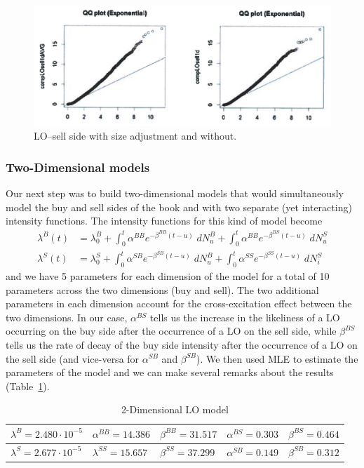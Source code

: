 	\begin{figure}[!ht]
   	\centering
   	\includegraphics[width=\textwidth]{chapters/chapter_trade_data_models/figures/losellsideadj.png} 
   	\caption{LO--sell side with size adjustment and without. \label{fig:losellsideadj}}
	\end{figure}


\subsubsection{Two-Dimensional models}

Our next step was to build two-dimensional models that would simultaneously model the buy and sell sides of the book and with two separate (yet interacting) intensity functions. The intensity functions for this kind of model become
	\[
	\begin{split}
	\lambda^B(t)&= \lambda_0^B + \int_0^t \alpha^{BB} e^{-\beta^{BB}(t-u)} \;dN_u^B + \int_0^t \alpha^{BB} e^{-\beta^{BS}(t-u)} \;dN_u^S \\
	\lambda^S(t)&= \lambda_0^S + \int_0^t \alpha^{SB} e^{-\beta^{SB}(t-u)} \; dN_u^B + \int_0^t \alpha^{SS} e^{-\beta^{SS}(t-u)} \;dN_i^S
	\end{split}
	\]
and we have 5 parameters for each dimension of the model for a total of 10 parameters across the two dimensions (buy and sell). The two additional parameters in each dimension account for the cross-excitation effect between the two dimensions. In our case, $\alpha^{BS}$ tells us the increase in the likeliness of a LO occurring on the buy side after the occurrence of a LO on the sell side, while $\beta^{BS}$ tells us the rate of decay of the buy side intensity after the occurrence of a LO on the sell side (and vice-versa for $\alpha^{SB}$ and $\beta^{SB}$). We then used MLE to estimate the parameters of the model and we can make several remarks about the results (Table~\ref{tab:2dimlomodel}).
	\begin{table}[!ht]
	\centering
	\caption{2-Dimensional LO model \label{tab:2dimlomodel}}
	\begin{tabular}{lllll}  
	$\lambda^B=2.480 \cdot 10^{-5}$ & $\alpha^{BB}=14.386$ & $\beta^{BB}=31.517$ & $\alpha^{BS}=0.303$ & $\beta^{BS}=0.464$ \\ \hline
	$\lambda^S=2.677 \cdot 10^{-5}$ & $\lambda^{SS}=15.657$ & $\beta^{SS}=37.299$ & $\alpha^{SB}=0.149$ & $\beta^{SB}=0.312$ \\ 
	\end{tabular}
	\end{table}
	
